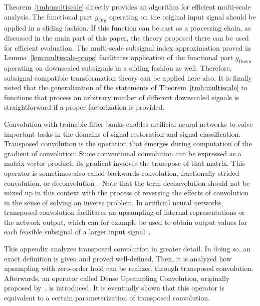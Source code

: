 \documentclass[journal]{IEEEtran}
\DeclareMathOperator{\Downsampling}{Down}
\DeclareMathOperator{\Original}{Org}
\begin{document}
Theorem~\ref{tmh:multiscale} directly provides an algorithm for efficient multi-scale analysis.
The functional part $g_{\Original}$ operating on the original input signal should be applied in a sliding fashion.
If this function can be cast as a processing chain, as discussed in the main part of this paper, the theory proposed there can be used for efficient evaluation.
The multi-scale subsignal index approximation proved in Lemma~\ref{lem:multiscale-props} facilitates application of the functional part $g_{\Downsampling}$ operating on downscaled subsignals in a sliding fashion as well.
Therefore, subsignal compatible transformation theory can be applied here also.
It is finally noted that the generalization of the statements of Theorem~\ref{tmh:multiscale} to functions that process an arbitrary number of different downscaled signals is straightforward if a proper factorization is provided.

\clearpage
{}
Convolution with trainable filter banks enables artificial neural networks to solve important tasks in the domains of signal restoration and signal classification.
Transposed convolution is the operation that emerges during computation of the gradient of convolution:
Since conventional convolution can be expressed as a matrix-vector product, its gradient involves the transpose of that matrix.
This operator is sometimes also called backwards convolution, fractionally strided convolution, or deconvolution~.
Note that the term deconvolution should not be mixed up in this context with the process of reversing the effects of convolution in the sense of solving an inverse problem.
In artificial neural networks, transposed convolution facilitates an upsampling of internal representations or the network output, which can for example be used to obtain output values for each feasible subsignal of a larger input signal~.

This appendix analyzes transposed convolution in greater detail.
In doing so, an exact definition is given and proved well-defined.
Then, it is analyzed how upsampling with zero-order hold can be realized through transposed convolution.
Afterwards, an operator called Dense Upsampling Convolution, originally proposed by~, is introduced.
It is eventually shown that this operator is equivalent to a certain parameterization of transposed convolution.
\end{document}

